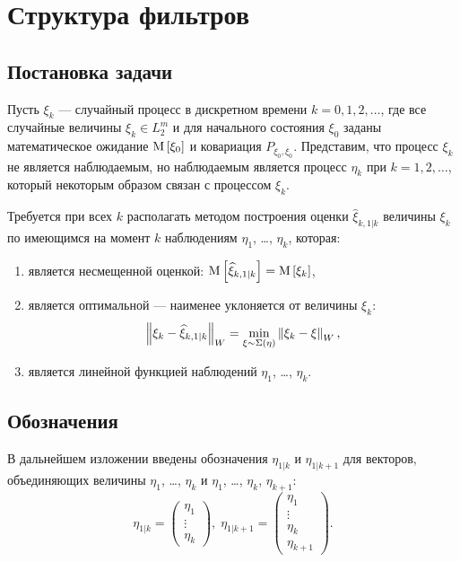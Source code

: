 \section{Структура фильтров} \label{section:filtering:in_states:process}

\subsection{Постановка задачи}

Пусть $\xi_k$ --- случайный процесс в дискретном времени $k = 0, 1, 2, \dots$, где все случайные величины $\xi_k \in L_2^m$ и для начального состояния $\xi_0$ заданы
математическое ожидание $\mathrm{M} \left [ \xi_0 \right ]$ и ковариация $P_{\xi_0, \xi_0}$. Представим, что процесс $\xi_k$ не является наблюдаемым, но наблюдаемым является процесс
$\eta_k$ при $k=1, 2, \dots$, который некоторым образом связан с процессом $\xi_k$.

Требуется при всех $k$ располагать методом построения оценки $\widehat{\xi}_{k,1|k}$ величины $\xi_k$ по имеющимся на момент $k$ наблюдениям $\eta_1$, \dots, $\eta_k$,
которая:
\begin{enumerate}
	\item является несмещенной оценкой: $\mathrm{M} \left [ \widehat{\xi}_{k,1|k} \right ] = \mathrm{M} \left [ \xi_k \right ]$,
	\item является оптимальной --- наименее уклоняется от величины $\xi_k$:
$$
	\left \| \xi_k - \widehat{\xi}_{k,1|k} \right \|_{W} = \min_{\xi \sim \Sigma (\eta)} \left \| \xi_k - \xi \right \|_{W} ,
$$
	\item является линейной функцией наблюдений $\eta_1$, \dots, $\eta_k$.
\end{enumerate}

\subsection{Обозначения}

В дальнейшем изложении введены обозначения $\eta_{1|k}$ и $\eta_{1|k+1}$ для векторов, объединяющих величины $\eta_1$, \dots, $\eta_{k}$ и
$\eta_1$, \dots, $\eta_{k}$, $\eta_{k+1}$:
$$
	\eta_{1|k}
	=
	\begin{pmatrix}
		\eta_1 \\
		\vdots \\
		\eta_{k}
	\end{pmatrix}
	, \;
	\eta_{1|k+1}
	=
	\begin{pmatrix}
		\eta_1 \\
		\vdots \\
		\eta_{k} \\
		\eta_{k+1}
	\end{pmatrix}
	.
$$

